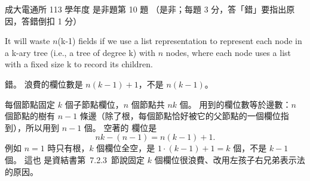 \begin{pastexam}[label={px:ncku-113-cce-09}]{成大電通所 113 學年度 是非題第 10 題}
（是非；每題 3 分，答「錯」要指出原因，答錯倒扣 1 分）

It will waste $n$(k-1) fields if we use a list representation to represent each node in a k-ary
tree (i.e., a tree of degree k) with $n$ nodes, where each node uses a list with a fixed size k to
record its children.
\end{pastexam}

\begin{pastsoln}
錯。 浪費的欄位數是 $n(k - 1) + 1$，不是 $n(k - 1)$。

每個節點固定 $k$ 個子節點欄位，$n$ 個節點共 $nk$ 個。 用到的欄位數等於邊數：$n$ 個節點的樹有
$n - 1$ 條邊（除了根，每個節點恰好被它的父節點的一個欄位指到），所以用到 $n - 1$ 個。 空著的
欄位是
\[
nk - (n - 1) = n(k - 1) + 1 .
\]
例如 $n = 1$ 時只有根，$k$ 個欄位全空，是 $1 \cdot (k - 1) + 1 = k$ 個，不是 $k - 1$ 個。 這也
是資結書第~7.2.3~節說固定 $k$ 個欄位很浪費、改用左孩子右兄弟表示法的原因。
\end{pastsoln}
